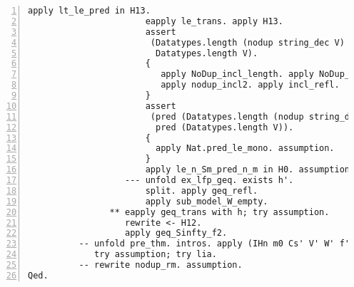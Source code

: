 \begin{lstlisting}[language=Coq, label={lst:thm_32_full_proof}, caption={Full proof of Theorem 3.2 in Coq}, numbers=left]
                       apply lt_le_pred in H13.
                       eapply le_trans. apply H13.
                       assert
                        (Datatypes.length (nodup string_dec V) <=
                         Datatypes.length V).
                       {
                          apply NoDup_incl_length. apply NoDup_nodup.
                          apply nodup_incl2. apply incl_refl.
                       }
                       assert
                        (pred (Datatypes.length (nodup string_dec V)) <=
                         pred (Datatypes.length V)).
                       {
                         apply Nat.pred_le_mono. assumption.
                       }
                       apply le_n_Sm_pred_n_m in H0. assumption.
                   --- unfold ex_lfp_geq. exists h'.
                       split. apply geq_refl.
                       apply sub_model_W_empty.
                ** eapply geq_trans with h; try assumption.
                   rewrite <- H12.
                   apply geq_Sinfty_f2.
          -- unfold pre_thm. intros. apply (IHn m0 Cs' V' W' f');
             try assumption; try lia.
          -- rewrite nodup_rm. assumption.
Qed.
\end{lstlisting}
